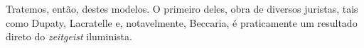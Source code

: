 \documentclass[12pt,a4paper]{article}
\begin{document}
	Tratemos, então, destes modelos. O primeiro deles, obra de diversos 
	juristas, tais como Dupaty, Lacratelle e, notavelmente, Beccaria, 
	é praticamente um resultado direto do \textit{zeitgeist} iluminista. 






\end{document}
